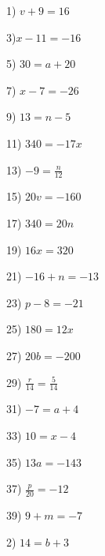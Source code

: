 \documentclass[11pt]{book}
\theoremstyle{definition}  %
\begin{document}
\begin{multicols}{2}
  1) $v + 9 = 16$ \ \ \ \ \ \ \ \ \ \ \ \ \ \ \ \ \ \ \
  
  3)$x - 11 = - 16$ \ \ \ \ \ \ \ \ \ \ \ \ \ \ \ \ \ \ \ \ \ \ \ \ \ \ \ \
  
  5) $30 = a + 20$ \ \ \ \ \ \ \ \ \ \ \ \ \ \ \ \ \ \ \ \ \ \ \ \ \ \ \ \ \
  \ \
  
  7) $x - 7 = - 26$ \ \ \ \ \ \ \ \ \ \ \ \ \ \ \ \ \ \ \ \ \ \ \ \ \ \ \ \ \
  \
  
  9) $13 = n - 5$ \ \ \ \ \ \ \ \ \ \ \ \ \ \ \ \ \ \ \ \ \ \ \ \ \ \ \ \ \ \
  \ \ \
  
  11) $340 = - 17 x$ \ \ \ \ \ \ \ \ \ \ \ \ \ \ \ \ \ \ \ \ \ \ \ \ \ \ \ \
  \
  
  13) $- 9 = \frac{n}{12}$ \ \ \ \ \ \ \ \ \ \ \ \ \ \ \ \ \ \ \ \ \ \ \ \ \
  \ \ \ \ \ \ \ \ \
  
  15) $20 v = - 160$ \ \ \ \ \ \ \ \ \ \ \ \ \ \ \ \ \ \ \ \ \ \ \ \ \ \ \ \
  \
  
  17) $340 = 20 n$ \ \ \ \ \ \ \ \ \ \ \ \ \ \ \ \ \ \ \ \ \ \ \ \ \ \ \ \ \
  \ \ \
  
  19) $16 x = 320$ \ \ \ \ \ \ \ \ \ \ \ \ \ \ \ \ \ \ \ \ \ \ \ \ \ \ \ \ \
  \
  
  21) $- 16 + n = - 13$ \ \ \ \ \ \ \ \ \ \ \ \ \ \ \ \ \ \ \ \ \ \ \
  
  23) $p - 8 = - 21$ \ \ \ \ \ \ \ \ \ \ \ \ \ \ \ \ \ \ \ \ \ \ \ \ \ \ \
  
  25) $180 = 12 x$ \ \ \ \ \ \ \ \ \ \ \ \ \ \ \ \ \ \ \ \ \ \ \ \ \ \ \ \ \
  \ \
  
  27) $20 b = - 200$ \ \ \ \ \ \ \ \ \ \ \ \ \ \ \ \ \ \ \ \ \ \ \ \ \ \ \ \
  \
  
  29) $\frac{r}{14} = \frac{5}{14}$ \ \ \ \ \ \ \ \ \ \ \ \ \ \ \ \ \ \ \ \ \
  \ \ \ \ \ \ \ \ \ \ \ \ \
  
  31) $- 7 = a + 4$ \ \ \ \ \ \ \ \ \ \ \ \ \ \ \ \ \ \ \ \ \ \ \ \ \ \ \ \ \
  
  33) $10 = x - 4$ \ \ \ \ \ \ \ \ \ \ \ \ \ \ \ \ \ \ \ \ \ \ \ \ \ \ \ \ \
  \ \
  
  35) $13 a = - 143$ \ \ \ \ \ \ \ \ \ \ \ \ \ \ \ \ \ \ \ \ \ \ \ \ \ \ \ \
  \
  
  37) $\frac{p}{20} = - 12$ \ \ \ \ \ \ \ \ \ \ \ \ \ \ \ \ \ \ \ \ \ \ \ \ \
  \ \ \ \ \ \ \ \
  
  39) $9 + m = - 7$ \ \ \ \ \ \ \ \ \ \ \ \ \ \ \ \ \ \ \ \ \ \ \ \ \ \ \ \ \
  \ \ \ \ \ \ \ \
  
  2) $14 = b + 3$
  

\end{multicols}
\end{document}
